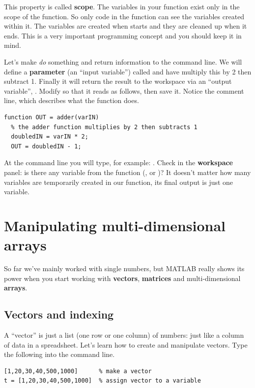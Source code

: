 \documentclass{article}
\begin{document}
This property is called \textbf{scope}.
The variables in your  function exist only in the scope of the  function. 
So only code in the  function can see the variables created within it.
The variables are created when  starts and they are cleaned up when it ends.
This is a very important programming concept and you should keep it in mind.

Let's make  \emph{do} something and return information to the command line.
We will define a \textbf{parameter} (an ``input variable'') called  and have  multiply this by 2 then subtract 1.
Finally it will return the result to the workspace via an ``output variable'', .
Modify  so that it reads as follows, then save it.
Notice the comment line, which describes what the function does. 
\begin{lstlisting}
function OUT = adder(varIN)
  % the adder function multiplies by 2 then subtracts 1
  doubledIN = varIN * 2;
  OUT = doubledIN - 1;
\end{lstlisting}

At the command line you will type, for example: .
Check in the \textbf{workspace} panel: is there any variable from the function (,  or )?
It doesn't matter how many variables are temporarily created in our function, its final output is just one variable.



\section{Manipulating multi-dimensional arrays}

So far we've mainly worked with single numbers, but MATLAB really shows its power when you start working with \textbf{vectors}, \textbf{matrices} and multi-dimensional \textbf{arrays}.

\subsection{Vectors and indexing}

A ``vector'' is just a list (one row or one column) of numbers: just like a column of data in a spreadsheet.
Let's learn how to create and manipulate vectors.
Type the following into the command line.
\begin{lstlisting}
[1,20,30,40,500,1000]      % make a vector
t = [1,20,30,40,500,1000]  % assign vector to a variable
\end{lstlisting}
\end{document}
